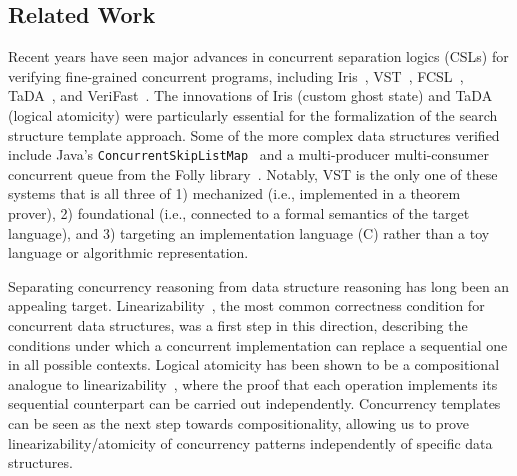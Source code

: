 \documentclass[sigplan,10pt, screen]{acmart}
\begin{document}
\subsection*{Related Work}
Recent years have seen major advances in concurrent separation logics (CSLs) for verifying fine-grained concurrent programs, including Iris~\cite{iris}, VST~\cite{plcc,iris-vst-arxiv}, FCSL~\cite{fcsl}, TaDA~\cite{tada}, and VeriFast~\cite{verifast-conc}. The innovations of Iris (custom ghost state) and TaDA (logical atomicity) were particularly essential for the formalization of the search structure template approach. Some of the more complex data structures verified include Java's \lstinline{ConcurrentSkipListMap}~\cite{Xiong2017Abstract} and a multi-producer multi-consumer concurrent queue from the Folly library~\cite{iris-folly}. Notably, VST is the only one of these systems that is all three of 1) mechanized (i.e., implemented in a theorem prover), 2) foundational (i.e., connected to a formal semantics of the target language), and 3) targeting an implementation language (C) rather than a toy language or algorithmic representation. %


Separating concurrency reasoning from data structure reasoning has long been an appealing target. Linearizability~\cite{linearizability}, the most common correctness condition for concurrent data structures, was a first step in this direction, describing the conditions under which a concurrent implementation can replace a sequential one in all possible contexts. Logical atomicity has been shown to be a compositional analogue to linearizability~\cite{la-lin}, where the proof that each operation implements its sequential counterpart can be carried out independently. Concurrency templates can be seen as the next step towards compositionality, allowing us to prove linearizability/atomicity of concurrency patterns independently of specific data structures.
\end{document}

